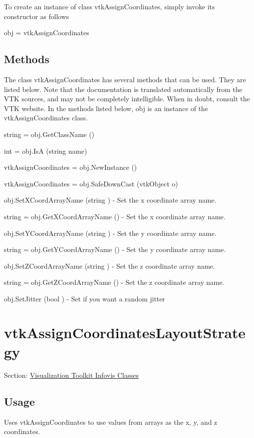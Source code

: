 To create an instance of class vtk\-Assign\-Coordinates, simply invoke its constructor as follows \begin{DoxyVerb}  obj = vtkAssignCoordinates
\end{DoxyVerb}
 \hypertarget{vtkwidgets_vtkxyplotwidget_Methods}{}\subsection{Methods}\label{vtkwidgets_vtkxyplotwidget_Methods}
The class vtk\-Assign\-Coordinates has several methods that can be used. They are listed below. Note that the documentation is translated automatically from the V\-T\-K sources, and may not be completely intelligible. When in doubt, consult the V\-T\-K website. In the methods listed below, {\ttfamily obj} is an instance of the vtk\-Assign\-Coordinates class. 
\begin{DoxyItemize}
\item {\ttfamily string = obj.\-Get\-Class\-Name ()}  
\item {\ttfamily int = obj.\-Is\-A (string name)}  
\item {\ttfamily vtk\-Assign\-Coordinates = obj.\-New\-Instance ()}  
\item {\ttfamily vtk\-Assign\-Coordinates = obj.\-Safe\-Down\-Cast (vtk\-Object o)}  
\item {\ttfamily obj.\-Set\-X\-Coord\-Array\-Name (string )} -\/ Set the x coordinate array name.  
\item {\ttfamily string = obj.\-Get\-X\-Coord\-Array\-Name ()} -\/ Set the x coordinate array name.  
\item {\ttfamily obj.\-Set\-Y\-Coord\-Array\-Name (string )} -\/ Set the y coordinate array name.  
\item {\ttfamily string = obj.\-Get\-Y\-Coord\-Array\-Name ()} -\/ Set the y coordinate array name.  
\item {\ttfamily obj.\-Set\-Z\-Coord\-Array\-Name (string )} -\/ Set the z coordinate array name.  
\item {\ttfamily string = obj.\-Get\-Z\-Coord\-Array\-Name ()} -\/ Set the z coordinate array name.  
\item {\ttfamily obj.\-Set\-Jitter (bool )} -\/ Set if you want a random jitter  
\end{DoxyItemize}\hypertarget{vtkinfovis_vtkassigncoordinateslayoutstrategy}{}\section{vtk\-Assign\-Coordinates\-Layout\-Strategy}\label{vtkinfovis_vtkassigncoordinateslayoutstrategy}
Section\-: \hyperlink{sec_vtkinfovis}{Visualization Toolkit Infovis Classes} \hypertarget{vtkwidgets_vtkxyplotwidget_Usage}{}\subsection{Usage}\label{vtkwidgets_vtkxyplotwidget_Usage}
Uses vtk\-Assign\-Coordinates to use values from arrays as the x, y, and z coordinates.

